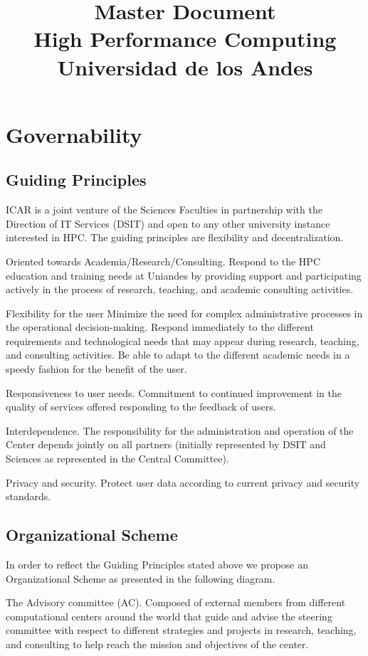 \documentclass{article}
\title{Master Document\\
High Performance Computing\\
Universidad de los Andes}
\begin{document}
\maketitle

\section{Governability}

\subsection{Guiding Principles}

ICAR is a joint venture of the Sciences Faculties in partnership with the Direction of IT Services (DSIT) and open to any other university instance interested in HPC. The guiding principles are flexibility and decentralization.

Oriented towards Academia/Research/Consulting. Respond to the HPC education and training needs at Uniandes by providing support and participating actively in the process of research, teaching, and academic consulting activities.

Flexibility for the user Minimize the need for complex administrative processes in the operational decision-making. Respond immediately to the different requirements and technological needs that may appear during research, teaching, and consulting activities. Be able to adapt to the different academic needs in a speedy fashion for the benefit of the user.

Responsiveness to user needs. Commitment to continued improvement in the quality of services offered responding to the feedback of users.

Interdependence. The responsibility for the administration and operation of the Center depends jointly on all partners (initially represented by DSIT and Sciences as represented in the Central Committee).

Privacy and security. Protect user data according to current privacy and security standards.

\subsection{Organizational Scheme}

In order to reflect the Guiding Principles stated above we propose an Organizational Scheme as presented in the following diagram.

The Advisory committee (AC). Composed of external members from different computational centers around the world that guide and advise the steering committee with respect to different strategies and projects in research, teaching, and consulting to help reach the mission and objectives of the center.
\end{document}
